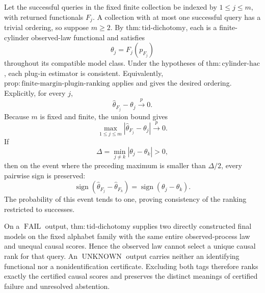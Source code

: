 Let the successful queries in the fixed finite collection be indexed by \(1\leq j\leq m\), with returned functionals \(F_j\).  A collection with at most one successful query has a trivial ordering, so suppose \(m\geq2\).  By \(\mathrm{thm:tid\text{-}dichotomy}\), each is a finite-cylinder observed-law functional and satisfies
\[
 \theta_j=F_j(p_{F_j})
\]
throughout its compatible model class.  Under the hypotheses of \(\mathrm{thm:cylinder\text{-}hac}\), each plug-in estimator is consistent.  Equivalently, \(\mathrm{prop:finite\text{-}margin\text{-}plugin\text{-}ranking}\) applies and gives the desired ordering.  Explicitly, for every \(j\),
\[
 \widehat\theta_{F_j}-\theta_j\overset p\longrightarrow0.
\]
Because \(m\) is fixed and finite, the union bound gives
\[
 \max_{1\leq j\leq m}|\widehat\theta_{F_j}-\theta_j|
 \overset p\longrightarrow0.
\]
If
\[
 \Delta=\min_{j\ne k}|\theta_j-\theta_k|>0,
\]
then on the event where the preceding maximum is smaller than \(\Delta/2\), every pairwise sign is preserved:
\[
 \operatorname{sign}(\widehat\theta_{F_j}-\widehat\theta_{F_k})
 =\operatorname{sign}(\theta_j-\theta_k).
\]
The probability of this event tends to one, proving consistency of the ranking restricted to successes.

On a \(\operatorname{FAIL}\) output, \(\mathrm{thm:tid\text{-}dichotomy}\) supplies two directly constructed final models on the fixed alphabet family with the same entire observed-process law and unequal causal scores.  Hence the observed law cannot select a unique causal rank for that query.  An \(\operatorname{UNKNOWN}\) output carries neither an identifying functional nor a nonidentification certificate.  Excluding both tags therefore ranks exactly the certified causal scores and preserves the distinct meanings of certified failure and unresolved abstention.

